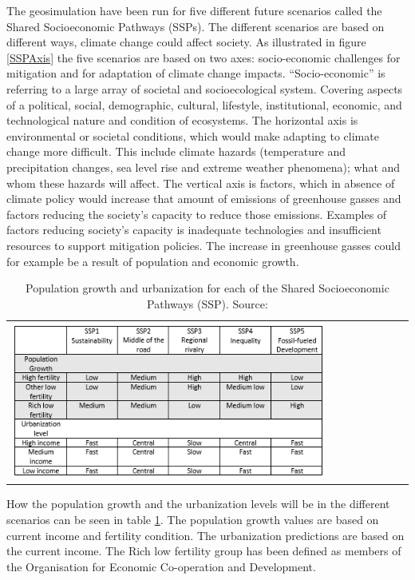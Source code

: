 The geosimulation have been run for five different future scenarios called the Shared Socioeconomic Pathways (SSPs). The different scenarios are based on different ways, climate change could affect society. As illustrated in figure \ref{SSPAxis} the five scenarios are based on two axes: socio-economic challenges for mitigation and for adaptation of climate change impacts. 
“Socio-economic” is referring to a large array of societal and socioecological system. Covering aspects of a political, social, demographic, cultural, lifestyle, institutional, economic, and technological nature and condition of ecosystems. 
The horizontal axis is environmental or societal conditions, which would make adapting to climate change more difficult. This include climate hazards (temperature and precipitation changes, sea level rise and extreme weather phenomena); what and whom these hazards will affect.
\citep{ConceptSSP}
The vertical axis is factors, which in absence of climate policy would increase that amount of emissions of greenhouse gasses and factors reducing the society’s capacity to reduce those emissions. Examples of factors reducing society’s capacity is inadequate technologies and insufficient resources to support mitigation policies. The increase in greenhouse gasses could for example be a result of population and economic growth.
\citep{SSP}

\begin{table}[htbp]
	\centering
	\begin{tabular}{l}
		\includegraphics[width=0.8\textwidth]{Pictures/SSPTable}
	\end{tabular}
	\caption{Population growth and urbanization for each of the Shared Socioeconomic Pathways (SSP). Source: \citet{WhyDetailedPop}}
	\label{SSPTable}
\end{table}

How the population growth and the urbanization levels will be in the different scenarios can be seen in table \ref{SSPTable}. The population growth values are based on current income and fertility condition. The urbanization predictions are based on the current income. The Rich low fertility group has been defined as members of the Organisation for Economic Co-operation and Development.


